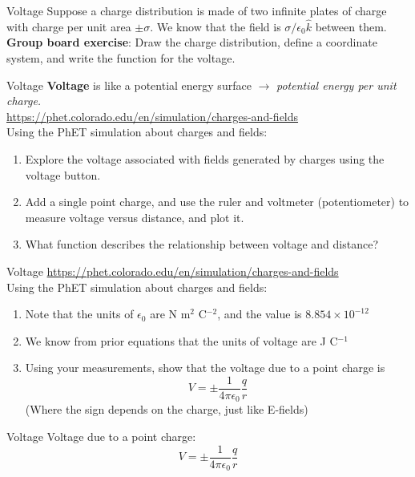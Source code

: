 \documentclass{beamer}
\begin{document}
\begin{frame}{Voltage}
Suppose a charge distribution is made of two infinite plates of charge with charge per unit area $\pm\sigma$.  We know that the field is $\sigma/\epsilon_0 \hat{k}$ between them.  \textbf{Group board exercise}: Draw the charge distribution, define a coordinate system, and write the function for the voltage.
\end{frame}

\begin{frame}{Voltage}
\textbf{Voltage} is like a potential energy surface $\rightarrow$ \textit{potential energy per unit charge.} \\ \vspace{0.5cm}
\url{https://phet.colorado.edu/en/simulation/charges-and-fields} \\
\alert{Using the PhET simulation about charges and fields}:
\begin{enumerate}
\item Explore the voltage associated with fields generated by charges using the voltage button.
\item Add a single point charge, and use the ruler and voltmeter (potentiometer) to measure voltage versus distance, and plot it.
\item What function describes the relationship between voltage and distance?
\end{enumerate}
\end{frame}

\begin{frame}{Voltage}
\url{https://phet.colorado.edu/en/simulation/charges-and-fields} \\
\alert{Using the PhET simulation about charges and fields}:
\begin{enumerate}
\item Note that the units of $\epsilon_0$ are N m$^2$ C$^{-2}$, and the value is $8.854\times 10^{-12}$
\item We know from prior equations that the units of voltage are J C$^{-1}$
\item Using your measurements, show that the voltage due to a point charge is
\begin{equation}
\boxed{
V = \pm \frac{1}{4\pi \epsilon_0} \frac{q}{r}}
\end{equation}
(Where the sign depends on the charge, just like E-fields)
\end{enumerate}
\end{frame}

\begin{frame}{Voltage}
Voltage due to a point charge:
\begin{equation}
\boxed{
V = \pm \frac{1}{4\pi \epsilon_0} \frac{q}{r}} \label{eq:volt2}
\end{equation}
\end{frame}
\end{document}
